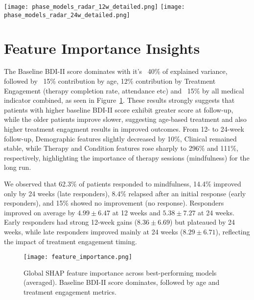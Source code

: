 \documentclass[conference]{IEEEtran}
\begin{document}
\begin{figure*}[t]
\centering
    \texttt{[image: phase\_models\_radar\_12w\_detailed.png]}
    \texttt{[image: phase\_models\_radar\_24w\_detailed.png]}
\caption{Detailed model-level radar plots showing individual performance of all 40 models grouped by phase. Each subplot displays one phase with all constituent models as radar points. This visualization reveals within-phase heterogeneity: Phase 5 shows highest variance (some models excel while others underperform), while Phase 2 demonstrates consistent moderate-to-good performance across all models, suggesting robust algorithmic choices.}
\label{fig:phase_models_detailed}
\end{figure*}




\section{Feature Importance Insights}
The Baseline BDI-II score dominates with it's ~40\% of explained variance, followed by ~15\% contribution by age, 12\% contribution by Treatment Engagement (therapy completion rate, attendance etc) and ~15\% by all medical indicator combined, as seen in Figure~\ref{fig:shap_global}. These results strongly suggests that patients with higher baseline BDI-II score exhibit greater score at follow-up, while the older patients improve slower, suggesting age-based treatment and also higher treatment engagment results in improved outcomes. From 12- to 24-week follow-up, Demographic features slightly decreased by 10\%, Clinical remained stable, while Therapy and Condition features rose sharply to 296\% and 111\%, respectively, highlighting the importance of therapy sessions (mindfulness) for the long run.

We observed that 62.3\% of patients responded to mindfulness, 14.4\% improved only by 24 weeks (late responders), 8.4\% relapsed after an initial response (early responders), and 15\% showed no improvement (no response). Responders improved on average by $4.99 \pm 6.47$ at 12 weeks and $5.38 \pm 7.27$ at 24 weeks. Early responders had strong 12-week gains ($8.36 \pm 6.69$) but plateaued by 24 weeks, while late responders improved mainly at 24 weeks ($8.29 \pm 6.71$), reflecting the impact of treatment engagement timing.


\begin{figure}[t]
\centering
\texttt{[image: feature\_importance.png]}
\caption{Global SHAP feature importance across best-performing models (averaged). Baseline BDI-II score dominates, followed by age and treatment engagement metrics.}
\label{fig:shap_global}
\end{figure}
\end{document}
